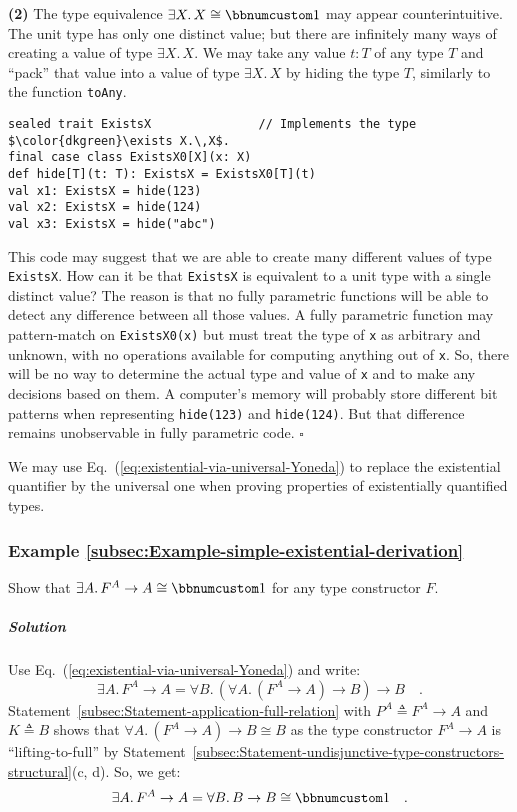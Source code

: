 \textbf{(2)} The type equivalence $\exists X.\,X\cong\bbnum 1$ may
appear counterintuitive. The unit type has only one distinct value;
but there are infinitely many ways of creating a value of type $\exists X.\,X$.
We may take any value $t:T$ of any type $T$ and \textsf{``}pack\textsf{''} that
value into a value of type $\exists X.\,X$ by hiding the type $T$,
similarly to the function \lstinline!toAny!.
\begin{lstlisting}[mathescape=true]
sealed trait ExistsX               // Implements the type $\color{dkgreen}\exists X.\,X$.
final case class ExistsX0[X](x: X)
def hide[T](t: T): ExistsX = ExistsX0[T](t)
val x1: ExistsX = hide(123)
val x2: ExistsX = hide(124)
val x3: ExistsX = hide("abc")
\end{lstlisting}
This code may suggest that we are able to create many different values
of type \lstinline!ExistsX!. How can it be that \lstinline!ExistsX!
is equivalent to a unit type with a single distinct value? The reason
is that no fully parametric functions will be able to detect any difference
between all those values. A fully parametric function may pattern-match
on \lstinline!ExistsX0(x)! but must treat the type of \lstinline!x!
as arbitrary and unknown, with no operations available for computing
anything out of \lstinline!x!. So, there will be no way to determine
the actual type and value of \lstinline!x! and to make any decisions
based on them. A computer\textsf{'}s memory will probably store different bit
patterns when representing \lstinline!hide(123)! and \lstinline!hide(124)!.
But that difference remains unobservable in fully parametric code.
$\square$

We may use Eq.~(\ref{eq:existential-via-universal-Yoneda}) to replace
the existential quantifier by the universal one when proving properties
of existentially quantified types.

\subsubsection{Example \label{subsec:Example-simple-existential-derivation}\ref{subsec:Example-simple-existential-derivation}}

Show that $\exists A.\,F^{A}\rightarrow A\cong\bbnum 1$ for any type
constructor $F$.

\subparagraph{Solution}

Use Eq.~(\ref{eq:existential-via-universal-Yoneda}) and write:
\[
\exists A.\,F^{A}\rightarrow A=\forall B.\,(\forall A.\,(F^{A}\rightarrow A)\rightarrow B)\rightarrow B\quad.
\]
Statement~\ref{subsec:Statement-application-full-relation} with
$P^{A}\triangleq F^{A}\rightarrow A$ and $K\triangleq B$ shows that
$\forall A.\,(F^{A}\rightarrow A)\rightarrow B\cong B$ as the type
constructor $F^{A}\rightarrow A$ is \textsf{``}lifting-to-full\textsf{''} by Statement~\ref{subsec:Statement-undisjunctive-type-constructors-structural}(c,
d). So, we get:
\[
\exists A.\,F^{A}\rightarrow A=\forall B.\,B\rightarrow B\cong\bbnum 1\quad.
\]


